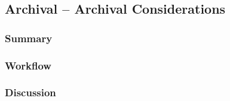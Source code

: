 \subsection{Archival -- Archival Considerations} \label{subsec:ff-archival}

	\subsubsection{Summary}
	
	\lipsum[1] %
	
	\subsubsection{Workflow}
	
	\lipsum[1] %
	
	\subsubsection{Discussion}
	
	\lipsum[1] %